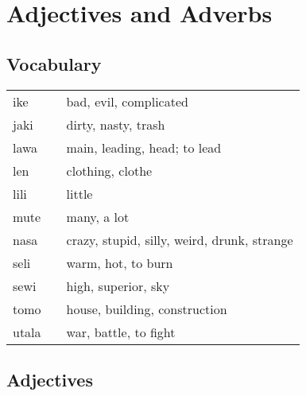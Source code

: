 \section{Adjectives and Adverbs}
\subsection*{Vocabulary}
\begin{supertabular}{p{5,5cm}|ll}
ike && bad, evil, complicated \\
jaki && dirty, nasty, trash \\
lawa && main, leading, head; to lead  \\         
len &&  clothing, clothe \\
lili &&  little \\
mute &&  many, a lot \\
nasa &&  crazy, stupid, silly, weird, drunk, strange \\
seli &&  warm, hot, to burn \\
sewi &&  high, superior, sky \\
tomo &&  house, building, construction \\
utala &&  war, battle, to fight \\
\end{supertabular} 
 
\subsection*{Adjectives}

